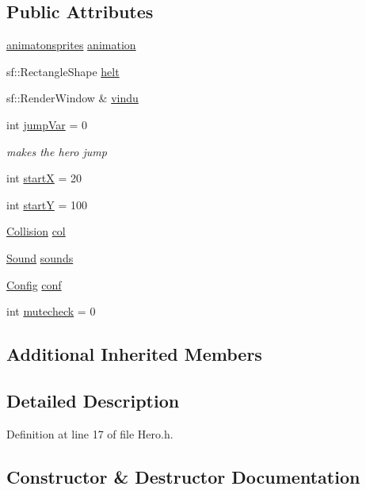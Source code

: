 \subsection*{Public Attributes}
\begin{DoxyCompactItemize}
\item 
\hyperlink{classanimatonsprites}{animatonsprites} \hyperlink{class_hero_a9c368b8a26455c128c1311063cdc03c1}{animation}
\item 
sf\+::\+Rectangle\+Shape \hyperlink{class_hero_a818f9a85aebe1f50a2d3ababa31f8e0a}{helt}
\item 
sf\+::\+Render\+Window \& \hyperlink{class_hero_af5ac5a52b7b852cafbe92d6ba4511e37}{vindu}
\item 
int \hyperlink{class_hero_ae881db3753a9ee23d80feed8d38b4dd6}{jump\+Var} = 0
\begin{DoxyCompactList}\small\item\em makes the hero jump \end{DoxyCompactList}\item 
int \hyperlink{class_hero_a546472f45445c2ad4db03ec6555d32fd}{startX} = 20
\item 
int \hyperlink{class_hero_a517e87f337a24614d52bab4dcf0287e9}{startY} = 100
\item 
\hyperlink{class_collision}{Collision} \hyperlink{class_hero_aea83769f887a67e6d88679a45952a61a}{col}
\item 
\hyperlink{class_sound}{Sound} \hyperlink{class_hero_ad280a3af2955ebcaff431dc94b5757ab}{sounds}
\item 
\hyperlink{class_config}{Config} \hyperlink{class_hero_adde89b9a9dcdfcb85d35ffa37b787714}{conf}
\item 
int \hyperlink{class_hero_afa058b7a5c0fca85db2608b849d6be97}{mutecheck} = 0
\end{DoxyCompactItemize}
\subsection*{Additional Inherited Members}


\subsection{Detailed Description}


Definition at line 17 of file Hero.\+h.



\subsection{Constructor \& Destructor Documentation}
\hypertarget{class_hero_aa8d54981ec6db2a2e0311f1dd213691e}{}\label{class_hero_aa8d54981ec6db2a2e0311f1dd213691e} 
